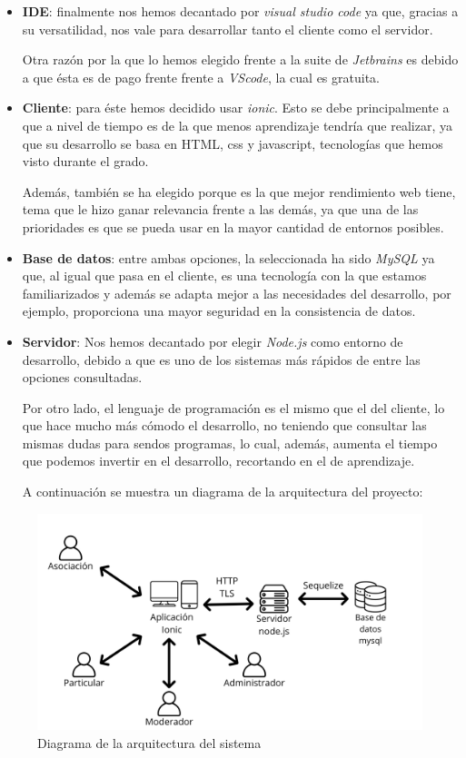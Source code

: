 \begin{itemize}
	\item \textbf{IDE}: finalmente nos hemos decantado por \textit{visual studio code} ya que, gracias a su versatilidad, nos vale para desarrollar tanto el cliente como el servidor. 
	
	Otra razón por la que lo hemos elegido frente a la suite de \textit{Jetbrains} es debido a que ésta es de pago frente frente a \textit{VScode}, la cual es gratuita.
	
	\item \textbf{Cliente}: para éste hemos decidido usar \textit{ionic}. Esto se debe principalmente a que a nivel de tiempo es de la que menos aprendizaje tendría que realizar, ya que su desarrollo se basa en HTML, css y javascript, tecnologías que hemos visto durante el grado.
	
	Además, también se ha elegido porque es la que mejor rendimiento web tiene, tema que le hizo ganar relevancia frente a las demás, ya que una de las prioridades es que se pueda usar en la mayor cantidad de entornos posibles.
	
	\item \textbf{Base de datos}: entre ambas opciones, la seleccionada ha sido \textit{MySQL} ya que, al igual que pasa en el cliente, es una tecnología con la que estamos familiarizados y además se adapta mejor a las necesidades del desarrollo, por ejemplo, proporciona una mayor seguridad en la consistencia de datos.
	
	\item \textbf{Servidor}: Nos hemos decantado por elegir \textit{Node.js} como entorno de desarrollo, debido a que es uno de los sistemas más rápidos de entre las opciones consultadas.
	
	Por otro lado, el lenguaje de programación es el mismo que el del cliente, lo que hace mucho más cómodo el desarrollo, no teniendo que consultar las mismas dudas para sendos programas, lo cual, además, aumenta el tiempo que podemos invertir en el desarrollo, recortando en el de aprendizaje.
	
	A continuación se muestra un diagrama de la arquitectura del proyecto: 
\end{itemize}
\begin{figure}[H]
	\centering
	\includegraphics[width=1\linewidth]{"Sprint 0/diagramaArquitectura"}
	\caption{Diagrama de la arquitectura del sistema}
	\label{fig:diagrama_arquitectura}
\end{figure}
